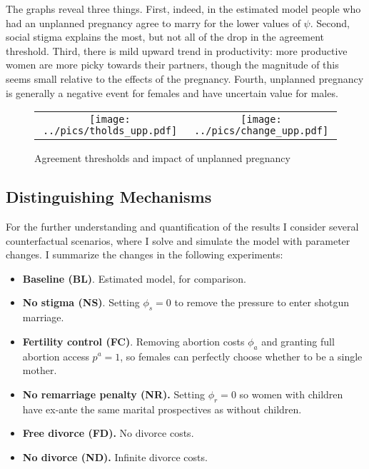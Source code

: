 \documentclass[12pt,letter]{article}
\begin{document}
The graphs reveal three things. First, indeed, in the estimated model people who had an unplanned pregnancy agree to marry for the lower values of $\psi$. Second,  social stigma explains the most, but not all of the drop in the agreement threshold. Third, there is mild upward trend in productivity: more productive women are more picky towards their partners, though the magnitude of this seems small relative to the effects of the pregnancy. Fourth, unplanned pregnancy is generally a negative event for females and have uncertain value for males.

\begin{figure}[h]
\caption{Agreement thresholds and impact of unplanned pregnancy\label{upp-tholds-graph}}
\begin{center}
\begin{tabular}{c c}
\texttt{[image: ../pics/tholds\_upp.pdf]} & \texttt{[image: ../pics/change\_upp.pdf]}
\end{tabular}
\end{center}
\end{figure}



\subsection{Distinguishing Mechanisms}
For the further understanding and quantification of the results I consider several counterfactual scenarios, where I solve and simulate the model with parameter changes. I summarize the changes in the following experiments:
\begin{itemize}
\item \textbf{Baseline (BL)}. Estimated model, for comparison.
\item \textbf{No stigma (NS)}. Setting $\phi_s = 0$ to remove the pressure to enter shotgun marriage.
\item \textbf{Fertility control (FC)}. Removing abortion costs $\phi_a$ and granting full abortion access $p^a = 1$, so females can perfectly choose whether to be a single mother.
\item \textbf{No remarriage penalty (NR).} Setting $\phi_r = 0$ so women with children have ex-ante the same marital prospectives as without children.
\item \textbf{Free divorce (FD).} No divorce costs.
\item \textbf{No divorce (ND).} Infinite divorce costs.
\end{itemize}
\end{document}
